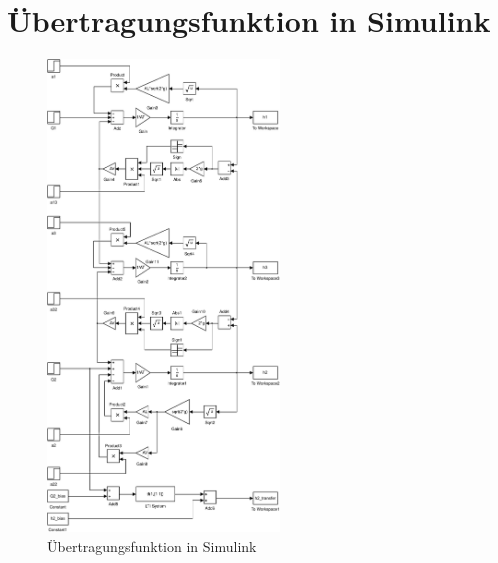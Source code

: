 \section{Übertragungsfunktion in Simulink}
\begin{figure}[h!]
    \centering
    \includegraphics[width=0.55\textwidth]{05/transfer_mdl.pdf}
    \caption{Übertragungsfunktion in Simulink}
    \label{fig:05_mdl}
\end{figure}


